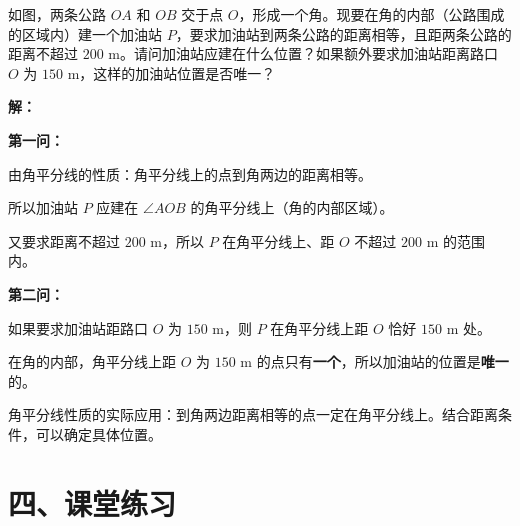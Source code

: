 \documentclass[12pt, a4paper]{ctexart}
\begin{document}
\begin{appbox}[【应用3】利用角平分线性质解决道路设计问题]
如图，两条公路 $OA$ 和 $OB$ 交于点 $O$，形成一个角。现要在角的内部（公路围成的区域内）建一个加油站 $P$，要求加油站到两条公路的距离相等，且距两条公路的距离不超过 $200\text{ m}$。请问加油站应建在什么位置？如果额外要求加油站距离路口 $O$ 为 $150\text{ m}$，这样的加油站位置是否唯一？

\begin{center}
\end{center}
\end{appbox}

\textbf{解：}

\textbf{第一问：}

由角平分线的性质：角平分线上的点到角两边的距离相等。

所以加油站 $P$ 应建在 $\angle AOB$ 的角平分线上（角的内部区域）。

又要求距离不超过 $200\text{ m}$，所以 $P$ 在角平分线上、距 $O$ 不超过 $200\text{ m}$ 的范围内。

\textbf{第二问：}

如果要求加油站距路口 $O$ 为 $150\text{ m}$，则 $P$ 在角平分线上距 $O$ 恰好 $150\text{ m}$ 处。

在角的内部，角平分线上距 $O$ 为 $150\text{ m}$ 的点只有\textbf{一个}，所以加油站的位置是\textbf{唯一}的。

\begin{tipbox}[方法总结]
角平分线性质的实际应用：到角两边距离相等的点一定在角平分线上。结合距离条件，可以确定具体位置。
\end{tipbox}

\section*{\textcolor{tipgreen}{四、课堂练习}}
\end{document}
